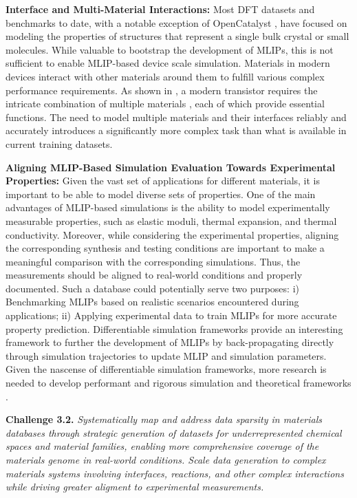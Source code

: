 \textbf{Interface and Multi-Material Interactions:}
Most DFT datasets and benchmarks to date, with a notable exception of OpenCatalyst \citep{chanussot2021open, tran2023open}, have focused on modeling the properties of structures that represent a single bulk crystal or small molecules. While valuable to bootstrap the development of MLIPs, this is not sufficient to enable MLIP-based device scale simulation. Materials in modern devices interact with other materials around them to fulfill various complex performance requirements. As shown in , a modern transistor requires the intricate combination of multiple materials \citep{reddy2022comprehensive}, each of which provide essential functions. The need to model multiple materials and their interfaces reliably and accurately introduces a significantly more complex task than what is available in current training datasets.

\textbf{Aligning MLIP-Based Simulation Evaluation Towards Experimental Properties:} Given the vast set of applications for different materials, it is important to be able to model diverse sets of properties. One of the main advantages of MLIP-based simulations is the ability to model experimentally measurable properties, such as elastic moduli, thermal expansion, and thermal conductivity. Moreover, while considering the experimental properties, aligning the corresponding synthesis and testing conditions are important to make a meaningful comparison with the corresponding simulations. Thus, the measurements should be aligned to real-world conditions and properly documented. Such a database could potentially serve two purposes: i) Benchmarking MLIPs based on realistic scenarios encountered during applications; ii) Applying experimental data to train MLIPs for more accurate property prediction. Differentiable simulation frameworks provide an interesting framework to further the development of MLIPs by back-propagating directly through simulation trajectories to update MLIP and simulation parameters. Given the nascense of differentiable simulation frameworks, more research is needed to develop performant and rigorous simulation and theoretical frameworks \citep{gangan2024force, metz2021gradients}.  

\textbf{Challenge 3.2.} \textit{Systematically map and address data sparsity in materials databases through strategic generation of datasets for underrepresented chemical spaces and material families, enabling more comprehensive coverage of the materials genome in real-world conditions. Scale data generation to complex materials systems involving interfaces, reactions, and other complex interactions while driving greater aligment to experimental measurements.}

